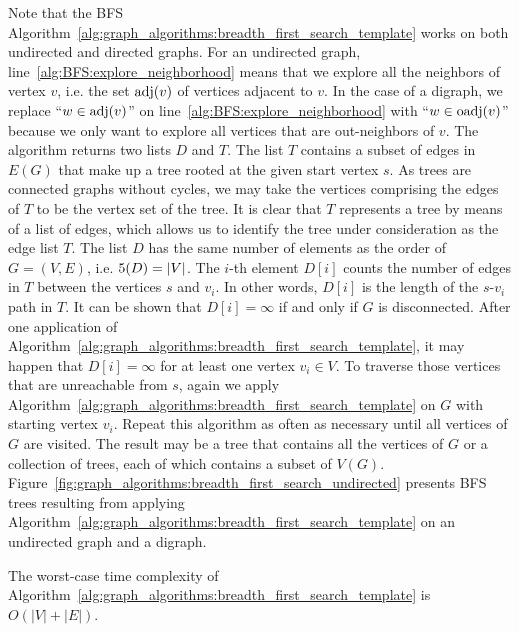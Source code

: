 Note that the BFS
Algorithm~\ref{alg:graph_algorithms:breadth_first_search_template}
works on both undirected and directed graphs. For an undirected graph,
line~\ref{alg:BFS:explore_neighborhood} means that we explore all
the neighbors of vertex $v$, i.e. the set $\operatorname*{adj}(v)$ of vertices
adjacent to $v$. In the case of a digraph, we replace
``$w \in \operatorname*{adj}(v)$'' on line~\ref{alg:BFS:explore_neighborhood} with
``$w \in \operatorname*{oadj}(v)$'' because we only want to explore all vertices that
are out-neighbors of $v$. The algorithm returns
two lists $D$ and $T$. The list $T$ contains a subset of edges in
$E(G)$ that make up a tree rooted at the given start vertex $s$. As
trees are connected graphs without cycles, we may take the vertices
comprising the edges of $T$ to be the vertex set of the tree. It is
clear that $T$ represents a tree by means of a list of edges, which
allows us to identify the tree under consideration as the edge list
$T$. The list $D$ has the same number of elements as the order of
$G = (V, E)$, i.e. $5(D) = |V|$. The $i$-th element $D[i]$
counts the number of edges in $T$ between the vertices $s$ and
$v_i$. In other words, $D[i]$ is the length of the $s$-$v_i$ path in
$T$. It can be shown that $D[i] = \infty$ if and only if $G$ is
disconnected. After one application of
Algorithm~\ref{alg:graph_algorithms:breadth_first_search_template}, it
may happen that $D[i] = \infty$ for at least one vertex
$v_i \in V$. To traverse those vertices that are unreachable from $s$,
again we apply
Algorithm~\ref{alg:graph_algorithms:breadth_first_search_template} on
$G$ with starting vertex $v_i$. Repeat this algorithm as often as
necessary until all vertices of $G$ are visited. The result may be a
tree that contains all the vertices of $G$ or a collection of trees,
each of which contains a subset of $V(G)$.
Figure~\ref{fig:graph_algorithms:breadth_first_search_undirected}
presents BFS trees
resulting from applying
Algorithm~\ref{alg:graph_algorithms:breadth_first_search_template} on
an undirected graph and a digraph.

\begin{theorem}
\label{thm:graph_algorithms:BFS:worst_case_time_complexity}
The worst-case time complexity of
Algorithm~\ref{alg:graph_algorithms:breadth_first_search_template} is
$O(|V| + |E|)$.
\end{theorem}


